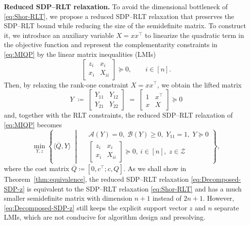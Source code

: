 \documentclass[11pt]{article}
\def\A{\mathcal{A}}
\def\B{\mathcal{B}}
\def\tb#1{\textbf{#1}}
\def\bQ{\overline{Q}}
\theoremstyle{plain}
\begin{document}
\medskip
\noindent\tb{Reduced SDP--RLT relaxation.}
To avoid the dimensional bottleneck of \eqref{eq:Shor-RLT}, we propose a reduced SDP--RLT relaxation that preserves the SDP--RLT bound while reducing the size of the semidefinite matrix. To construct it, we introduce an auxiliary variable $X=xx^\top$ to linearize the quadratic term in the objective function and represent the complementarity constraints in \eqref{eq:MIQP} by the linear matrix inequalities (LMIs)
\[
\begin{bmatrix}
    z_i&x_i\\x_i & X_{ii}
\end{bmatrix}\succeq 0,\qquad i\in [n].
\]
Then, by relaxing the rank-one constraint $X=xx^\top$, we obtain the lifted matrix
\begin{equation}\label{eq:Y}
    Y
\;\coloneq\; 
\begin{bmatrix}
    Y_{11} &Y_{12}\\Y_{21} & Y_{22}
\end{bmatrix}
\;=\;
\begin{bmatrix}
    1&x^\top \\
    x&X
\end{bmatrix}\succeq 0
\end{equation}
and, together with the RLT constraints, the reduced SDP--RLT relaxation of \eqref{eq:MIQP} becomes
\begin{equation}
\label{eq:Decomposed-SDP-z}
\min_{Y,z}\left\{
\langle \bQ,Y \rangle  \;\middle|\;  
\begin{aligned}
&\A(Y)=0,\; \B(Y)\geq 0,\;Y_{11}=1,\; Y\succeq 0\\
& \begin{bmatrix}
z_i & x_i\\
x_i & X_{ii}
\end{bmatrix}\succeq 0,\ i\in [n],\;z\in \mathcal{Z}
\end{aligned}
\right\},
\end{equation}
where the cost matrix $\bQ\coloneqq [ 0, c^\top; c, Q]$.
As we shall show in Theorem~\ref{thm:equivalence}, the reduced SDP--RLT relaxation \eqref{eq:Decomposed-SDP-z} is equivalent to the SDP--RLT relaxation \eqref{eq:Shor-RLT} and has a much smaller semidefinite matrix with dimension $n+1$ instead of $2n+1$.
However, \eqref{eq:Decomposed-SDP-z} still keeps the explicit support vector $z$ and $n$ separate LMIs, which are not conducive for algorithm design and presolving.
\end{document}
